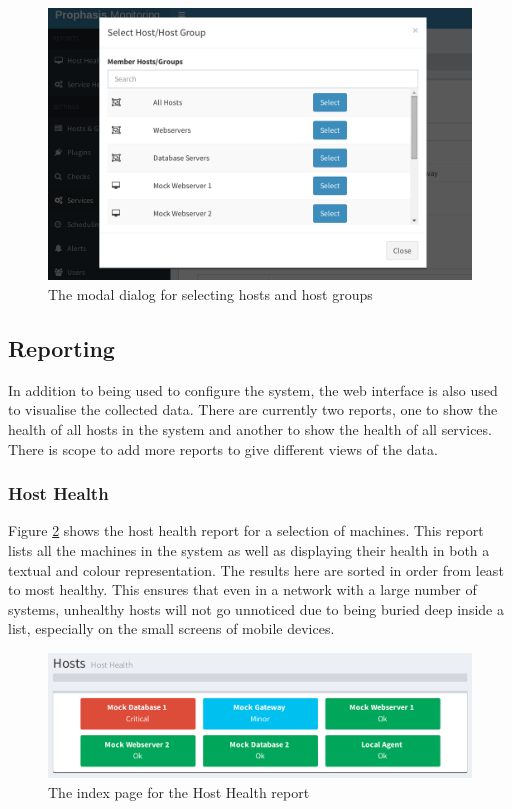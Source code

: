 \documentclass[bsc,logo,twoside,parskip,singlespacing,notimes]{infthesis}
\begin{document}
\begin{figure}[H]
	\centering
	\caption{The modal dialog for selecting hosts and host groups}
	\label{edit-service-modal}
	\includegraphics[scale=0.44]{assets/screenshots/edit-service-modal.pdf}
\end{figure}

\subsection{Reporting}

	In addition to being used to configure the system, the web interface is also
	used to visualise the collected data.  There are currently two reports, one
	to show the health of all hosts in the system and another to show the health
	of all services.  There is scope to add more reports to give different views
	of the data.
\subsubsection{Host Health}

	Figure \ref{host-health-index} shows the host health report for
	a selection of machines.  This report lists all the machines in the system
	as well as displaying their health in both a textual and colour representation.
	The results here are sorted in order from least to most healthy.  This ensures
	that even in a network with a large number of systems, unhealthy hosts will not
	go unnoticed due to being buried deep inside a list, especially on the small
	screens of mobile devices.

\begin{figure}[H]
	\centering
	\caption{The index page for the Host Health report}
	\label{host-health-index}
	\includegraphics[scale=0.7]{assets/screenshots/host-health-index.pdf}
\end{figure}
\end{document}
